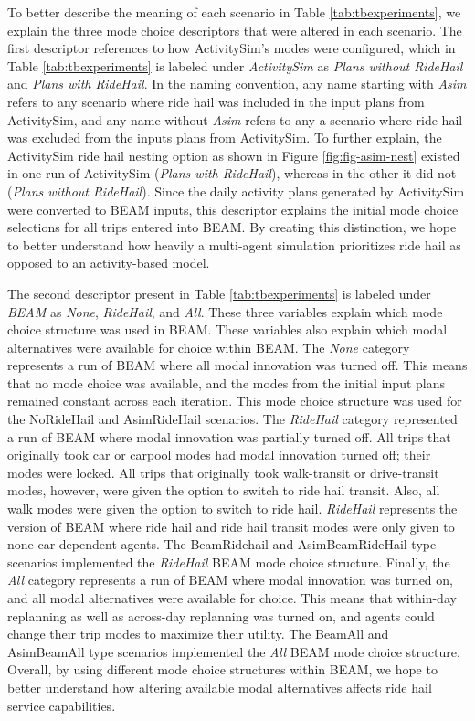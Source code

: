 \documentclass[fancy, masters]{byuthesis}
\begin{document}
To better describe the meaning of each scenario in Table \ref{tab:tbexperiments}, we explain the three mode choice descriptors that were altered in each scenario. The first descriptor references to how ActivitySim's modes were configured, which in Table \ref{tab:tbexperiments} is labeled under \emph{ActivitySim} as \emph{Plans without RideHail} and \emph{Plans with RideHail}. In the naming convention, any name starting with \emph{Asim} refers to any scenario where ride hail was included in the input plans from ActivitySim, and any name without \emph{Asim} refers to any a scenario where ride hail was excluded from the inputs plans from ActivitySim. To further explain, the ActivitySim ride hail nesting option as shown in Figure \ref{fig:fig-asim-nest} existed in one run of ActivitySim (\emph{Plans with RideHail}), whereas in the other it did not (\emph{Plans without RideHail}). Since the daily activity plans generated by ActivitySim were converted to BEAM inputs, this descriptor explains the initial mode choice selections for all trips entered into BEAM. By creating this distinction, we hope to better understand how heavily a multi-agent simulation prioritizes ride hail as opposed to an activity-based model.

The second descriptor present in Table \ref{tab:tbexperiments} is labeled under \emph{BEAM} as \emph{None}, \emph{RideHail}, and \emph{All}. These three variables explain which mode choice structure was used in BEAM. These variables also explain which modal alternatives were available for choice within BEAM. The \emph{None} category represents a run of BEAM where all modal innovation was turned off. This means that no mode choice was available, and the modes from the initial input plans remained constant across each iteration. This mode choice structure was used for the NoRideHail and AsimRideHail scenarios. The \emph{RideHail} category represented a run of BEAM where modal innovation was partially turned off. All trips that originally took car or carpool modes had modal innovation turned off; their modes were locked. All trips that originally took walk-transit or drive-transit modes, however, were given the option to switch to ride hail transit. Also, all walk modes were given the option to switch to ride hail. \emph{RideHail} represents the version of BEAM where ride hail and ride hail transit modes were only given to none-car dependent agents. The BeamRidehail and AsimBeamRideHail type scenarios implemented the \emph{RideHail} BEAM mode choice structure. Finally, the \emph{All} category represents a run of BEAM where modal innovation was turned on, and all modal alternatives were available for choice. This means that within-day replanning as well as across-day replanning was turned on, and agents could change their trip modes to maximize their utility. The BeamAll and AsimBeamAll type scenarios implemented the \emph{All} BEAM mode choice structure. Overall, by using different mode choice structures within BEAM, we hope to better understand how altering available modal alternatives affects ride hail service capabilities.
\end{document}
